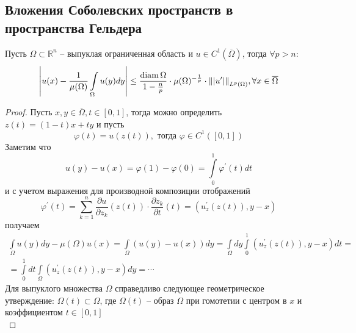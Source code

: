 \documentclass[12pt,a4paper]{article}
\newcommand{\intset}[1]{\int\limits_{#1}}
\newcommand{\Real}{\mathbb{R}}
\DeclareMathOperator\diam{diam}
\begin{document}
\subsection{Вложения Соболевских пространств в пространства Гельдера}

\begin{lemma}{}{}
	Пусть $\Omega \subset \Real^n$ -- выпуклая ограниченная область и $u \in C^1 (\overline{\Omega})$, тогда $\forall p > n$:
	\begin{equation*}
		\left|u(x) - \frac{1}{\mu(\Omega)}\intset{\Omega}{u(y)dy}\right| \leq \frac{\diam \Omega}{1 - \frac{n}{p}} \cdot \mu(\Omega)^{-\frac{1}{p}} \cdot \norm{|u^\prime|}_{L^p (\Omega)}, \forall x \in \overline{\Omega}
	\end{equation*}
\end{lemma}
\begin{proof}
	Пусть $x, y \in \overline{\Omega}, t \in [0, 1]$, тогда можно определить \\ $z(t) = (1-t)x + ty$ и пусть 
	\begin{equation*}
		\varphi(t) = u(z(t)), \text{ тогда } \varphi \in C^1 ([0, 1])
	\end{equation*}
	Заметим что
	\begin{equation*}
		u(y) - u(x) = \varphi(1) - \varphi(0) = \int\limits_{0}^{1}{\varphi^\prime (t) dt}
	\end{equation*}
	и с учетом выражения для производной композиции отображений
	\begin{equation*}
		\varphi^\prime (t) = \sum\limits_{k=1}^{n}{\frac{\partial u}{\partial z_k} (z(t)) \cdot \frac{\partial z_k}{\partial t} (t)} = (u_z^\prime (z(t)), y - x)
	\end{equation*}
	получаем
	\begin{multline*}
		\intset{\Omega}{u(y) dy} - \mu(\Omega) u(x) = \intset{\Omega}{(u(y) - u(x)) dy} = \intset{\Omega}{dy \int\limits_{0}^{1}{(u_z^\prime (z(t)), y - x)dt}} = \\ = \int\limits_{0}^{1}{dt \intset{\Omega}{(u_z^\prime (z(t)), y - x)dy}} = \cdots
	\end{multline*}
	Для выпуклого множества $\Omega$ справедливо следующее геометрическое утверждение: $\Omega(t) \subset \Omega$, где $\Omega(t)$ -- образ $\Omega$ при гомотетии с центром в $x$ и коэффициентом $t \in [0, 1]$ \\

\end{proof}
\end{document}
